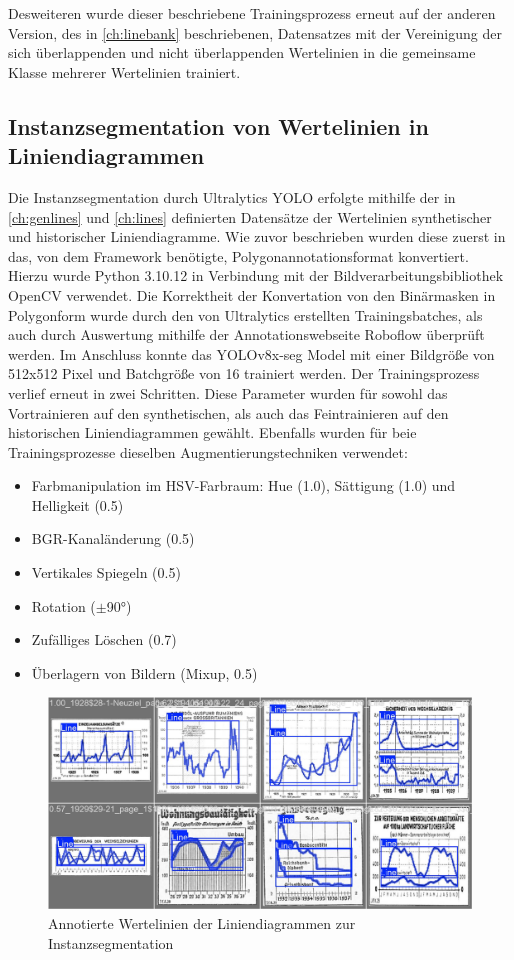 Desweiteren wurde dieser beschriebene Trainingsprozess erneut auf der anderen Version, des in \ref{ch:linebank} beschriebenen, Datensatzes mit der Vereinigung der sich überlappenden und nicht überlappenden Wertelinien in die gemeinsame Klasse mehrerer Wertelinien trainiert.

\subsection{Instanzsegmentation von Wertelinien in Liniendiagrammen}

Die Instanzsegmentation durch Ultralytics YOLO erfolgte mithilfe der in \ref{ch:genlines} und \ref{ch:lines} definierten Datensätze der Wertelinien synthetischer und historischer Liniendiagramme. Wie zuvor beschrieben wurden diese zuerst in das, von dem Framework benötigte, Polygonannotationsformat konvertiert. Hierzu wurde Python 3.10.12 in Verbindung mit der Bildverarbeitungsbibliothek OpenCV \cite{opencv_library} verwendet. Die Korrektheit der Konvertation von den Binärmasken in Polygonform wurde durch den von Ultralytics erstellten Trainingsbatches, als auch durch Auswertung mithilfe der Annotationswebseite Roboflow \cite{dwyer2024roboflow} überprüft werden. Im Anschluss konnte das YOLOv8x-seg Model mit einer Bildgröße von 512x512 Pixel und Batchgröße von 16 trainiert werden. Der Trainingsprozess verlief erneut in zwei Schritten.
Diese Parameter wurden für sowohl das Vortrainieren auf den synthetischen, als auch das Feintrainieren auf den  historischen Liniendiagrammen gewählt. Ebenfalls wurden für beie Trainingsprozesse dieselben Augmentierungstechniken verwendet:

\begin{itemize}[itemsep=0pt, topsep=0pt]
    \item Farbmanipulation im HSV-Farbraum: Hue (1.0), Sättigung (1.0) und Helligkeit (0.5)
    \item BGR-Kanaländerung (0.5)
    \item Vertikales Spiegeln (0.5)
    \item Rotation ($\pm$90°)
    \item Zufälliges Löschen (0.7)
    \item Überlagern von Bildern (Mixup, 0.5)
\end{itemize}

\begin{figure}[H]
    \centering
    \captionsetup{width=.75\linewidth}
    \includegraphics[width=.75\textwidth]{Implementation/img/instance_annotated.png}
    \caption{ Annotierte Wertelinien der Liniendiagrammen zur Instanzsegmentation}
    \label{fig:instance_annotated}
\end{figure}

